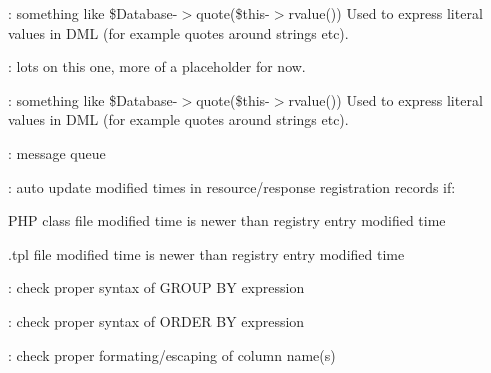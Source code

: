 \begin{DoxyRefList}
\+: something like \$\+Database-\/$>$quote(\$this-\/$>$rvalue()) Used to express literal values in D\+M\+L (for example quotes around strings etc). 
\item[\label{todo__todo000008}%
\hypertarget{todo__todo000008}{}%
Global \hyperlink{interface_able_polecat___query_language___statement_interface_a7e8b7ade103075378490c24d61b098bd}{Able\+Polecat\+\_\+\+Query\+Language\+\_\+\+Statement\+Interface\+:\+:get\+Literal\+Expression} (\$literal, \$type=N\+U\+L\+L)]\+: lots on this one, more of a placeholder for now. 

\+: something like \$\+Database-\/$>$quote(\$this-\/$>$rvalue()) Used to express literal values in D\+M\+L (for example quotes around strings etc). 
\item[\label{todo__todo000012}%
\hypertarget{todo__todo000012}{}%
Global \hyperlink{class_able_polecat___service___bus_aae046bbb8c846e4d0a266db8991fa7a7}{Able\+Polecat\+\_\+\+Service\+\_\+\+Bus\+:\+:\$Messages} ]\+: message queue  
\item[\label{todo__todo000013}%
\hypertarget{todo__todo000013}{}%
Global \hyperlink{class_able_polecat___service___bus_a01219e75781fce23cab2d8ff3ad781be}{Able\+Polecat\+\_\+\+Service\+\_\+\+Bus\+:\+:get\+Response} (\hyperlink{interface_able_polecat___resource_interface}{Able\+Polecat\+\_\+\+Resource\+Interface} \$\+Resource, \$status\+Code)]\+: auto update modified times in resource/response registration records if\+:
\begin{DoxyItemize}
\item P\+H\+P class file modified time is newer than registry entry modified time
\item .tpl file modified time is newer than registry entry modified time 
\end{DoxyItemize}
\item[\label{todo__todo000017}%
\hypertarget{todo__todo000017}{}%
Global \hyperlink{class_able_polecat___service___dtx_abstract_a4ecaa0a2c1ecb9a47f85b357d65a8dd4}{Able\+Polecat\+\_\+\+Service\+\_\+\+Dtx\+Abstract\+:\+:set\+Group\+By\+Expression} (\$group\+\_\+by\+\_\+expression)]\+: check proper syntax of G\+R\+O\+U\+P B\+Y expression  
\item[\label{todo__todo000018}%
\hypertarget{todo__todo000018}{}%
Global \hyperlink{class_able_polecat___service___dtx_abstract_a861af4015034dbff8963261a7d22237d}{Able\+Polecat\+\_\+\+Service\+\_\+\+Dtx\+Abstract\+:\+:set\+Order\+By\+Expression} (\$order\+\_\+by\+\_\+expression)]\+: check proper syntax of O\+R\+D\+E\+R B\+Y expression  
\item[\label{todo__todo000015}%
\hypertarget{todo__todo000015}{}%
Global \hyperlink{class_able_polecat___service___dtx_abstract_aaf145251ff829dc64ee23ba36eba9a94}{Able\+Polecat\+\_\+\+Service\+\_\+\+Dtx\+Abstract\+:\+:set\+Select\+Columns} (\$select\+\_\+columns)]\+: check proper formating/escaping of column name(s) 


\end{DoxyRefList}
